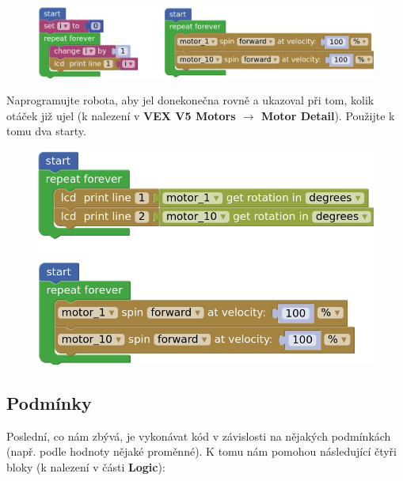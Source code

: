 \documentclass[../main.tex]{subfiles}
\begin{document}
	\begin{figure}[h!]
		\centering
		\begin{minipage}{0.8\textwidth}
			\includegraphics[width=\linewidth]{Images/05/2start.png}
		\end{minipage}
	\end{figure}

	\begin{question}
		Naprogramujte robota, aby jel donekonečna rovně a ukazoval při tom, kolik otáček již ujel (k nalezení v \textbf{VEX V5 Motors $\rightarrow$ Motor Detail}). Použijte k tomu dva starty.
	\end{question}

	\begin{solution}
		\begin{figure}
			\centering
			\begin{minipage}{0.5\textwidth}
				\includegraphics[width=\linewidth]{Images/05/solo.png}
			\end{minipage}
		\end{figure}
	\end{solution}

	\subsection{Podmínky}\label{cha:logic}
	Poslední, co nám zbývá, je vykonávat kód v závislosti na nějakých podmínkách (např. podle hodnoty nějaké proměnné). K tomu nám pomohou následující čtyři bloky (k nalezení v části \textbf{Logic}):
	\begin{itemize}
		\blockLogicIf
		\blockLogicIfElse
		\blockLogicComparison
		\blockLogicOperator
	\end{itemize}
\end{document}
